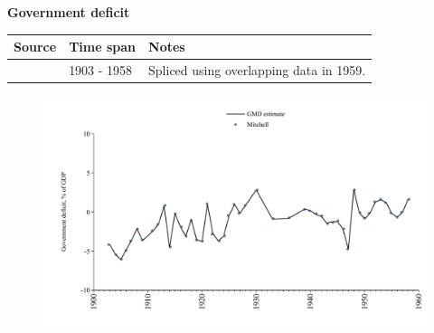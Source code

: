 \documentclass[12pt,a4paper,landscape]{article}
\begin{document}
\begin{adjustbox}{max totalsize={\paperwidth}{\paperheight},center}
\begin{minipage}[t][\textheight][t]{\textwidth}
\vspace*{0.5cm}
{}
\begin{center}
{\Large\bfseries Government deficit}
\end{center}
\vspace{0.5cm}
\begin{table}[H]
\centering
\small
\begin{tabular}{|l|l|l|}
\hline
\textbf{Source} & \textbf{Time span} & \textbf{Notes} \\
\hline
\rowcolor{white}\cite{Mitchell}& 1903 - 1958 &Spliced using overlapping data in 1959. \\
\hline
\end{tabular}
\end{table}
\begin{figure}[H]
\centering
\includegraphics[width=\textwidth,height=0.6\textheight,keepaspectratio]{graphs/CUB_govdef_GDP.pdf}
\end{figure}
\end{minipage}
\end{adjustbox}
\end{document}
